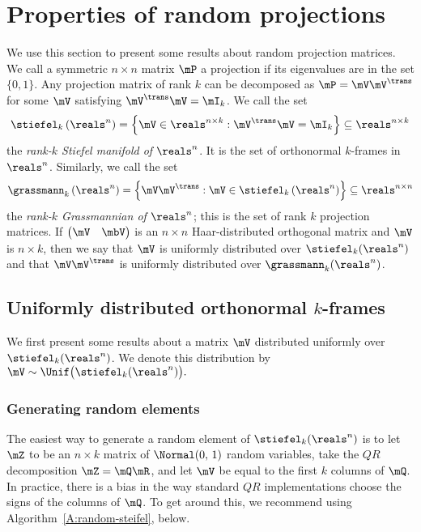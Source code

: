 
\chapter{Properties of random projections}

We use this section to present some results about random projection
matrices.  We call a symmetric $n\times n$ matrix $\mP$ a projection 
if its eigenvalues are in the set $\{ 0, 1 \}$.  Any projection matrix of rank
$k$ can be decomposed as $\mP = \mV \mV^\trans$ for some $\mV$
satisfying $\mV^\trans \mV = \mI_k$.  We call the set 
\[
    \stiefel_{k}\left( \reals^n \right)
        =
        \left\{
            \mV \in \reals^{n \times k}
            :
            \mV^\trans \mV = \mI_k
        \right\}
        \subseteq
        \reals^{n \times k}
\]
the \emph{rank-$k$ Stiefel manifold of $\reals^n$}.  It is the set
of orthonormal $k$-frames in $\reals^n$.  Similarly, we call 
the set
\[
    \grassmann_k\left( \reals^n \right)
        =
        \left\{
            \mV \mV^\trans
            :
            \mV \in \stiefel_k \left( \reals^n \right)
        \right\}
        \subseteq
        \reals^{n \times n}
\]
the \emph{rank-$k$ Grassmannian of $\reals^n$}; this is the set of
rank $k$ projection matrices.  If
\(
    \left(
    \begin{matrix}
        \mV & \mbV
    \end{matrix}
    \right)
\)
is an $n\times n$ Haar-distributed orthogonal matrix and $\mV$ is
$n \times k$, then we say that $\mV$ is uniformly distributed
over $\stiefel_k( \reals^n )$ and that $\mV \mV^\trans$ is uniformly
distributed over $\grassmann_k(\reals^n)$.


\section{Uniformly distributed orthonormal $k$-frames}

We first present some results about a matrix $\mV$ distributed uniformly
over $\stiefel_k(\reals^n)$.  We denote this distribution by
\(
    \mV 
        \sim
            \Unif \big(
                \stiefel_k(\reals^n)
            \big).
\)

\subsection{Generating random elements}

The easiest way to generate a random element of $\stiefel_k(\reals^n)$ is
to let $\mZ$ to be an $n \times k$ matrix of \iid $\Normal( 0, \, 1)$
random variables, take the $QR$ decomposition $\mZ = \mQ \mR$, and let
$\mV$ be equal to the first $k$ columns of $\mQ$.  In practice, there is
a bias in the way standard $QR$ implementations choose the signs of the
columns of $\mQ$.  To get around this, we recommend using 
Algorithm~\ref{A:random-steifel}, below.

